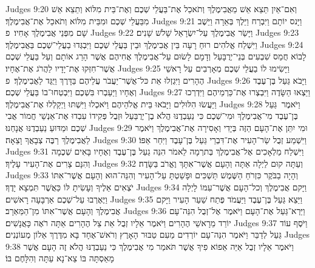 Judges 9:20	וְאִם־אַיִן תֵּצֵא אֵשׁ מֵאֲבִימֶלֶךְ וְתֹאכַל אֶת־בַּעֲלֵי שְׁכֶם וְאֶת־בֵּית מִלּוֹא וְתֵצֵא אֵשׁ מִבַּעֲלֵי שְׁכֶם וּמִבֵּית מִלּוֹא וְתֹאכַל אֶת־אֲבִימֶלֶךְ׃
Judges 9:21	וַיָּנס יוֹתָם וַיִּבְרַח וַיֵּלֶךְ בְּאֵרָה וַיֵּשֶׁב שָׁם מִפְּנֵי אֲבִימֶלֶךְ אָחִיו׃ {פ}
Judges 9:22	וַיָּשַׂר אֲבִימֶלֶךְ עַל־יִשְׂרָאֵל שָׁלֹשׁ שָׁנִים׃
Judges 9:23	וַיִּשְׁלַח אֱלֹהִים רוּחַ רָעָה בֵּין אֲבִימֶלֶךְ וּבֵין בַּעֲלֵי שְׁכֶם וַיִּבְגְּדוּ בַעֲלֵי־שְׁכֶם בַּאֲבִימֶלֶךְ׃
Judges 9:24	לָבוֹא חֲמַס שִׁבְעִים בְּנֵי־יְרֻבָּעַל וְדָמָם לָשׂוּם עַל־אֲבִימֶלֶךְ אֲחִיהֶם אֲשֶׁר הָרַג אוֹתָם וְעַל בַּעֲלֵי שְׁכֶם אֲשֶׁר־חִזְּקוּ אֶת־יָדָיו לַהֲרֹג אֶת־אֶחָיו׃
Judges 9:25	וַיָּשִׂימוּ לוֹ בַעֲלֵי שְׁכֶם מְאָרְבִים עַל רָאשֵׁי הֶהָרִים וַיִּגְזְלוּ אֵת כּל־אֲשֶׁר־יַעֲבֹר עֲלֵיהֶם בַּדָּרֶךְ וַיֻּגַּד לַאֲבִימֶלֶךְ׃ {פ}
Judges 9:26	וַיָּבֹא גַּעַל בֶּן־עֶבֶד וְאֶחָיו וַיַּעַבְרוּ בִּשְׁכֶם וַיִּבְטְחוּ־בוֹ בַּעֲלֵי שְׁכֶם׃
Judges 9:27	וַיֵּצְאוּ הַשָּׂדֶה וַיִּבְצְרוּ אֶת־כַּרְמֵיהֶם וַיִּדְרְכוּ וַיַּעֲשׂוּ הִלּוּלִים וַיָּבֹאוּ בֵּית אֱלֹהֵיהֶם וַיֹּאכְלוּ וַיִּשְׁתּוּ וַיְקַלְלוּ אֶת־אֲבִימֶלֶךְ׃
Judges 9:28	וַיֹּאמֶר  גַּעַל בֶּן־עֶבֶד מִי־אֲבִימֶלֶךְ וּמִי־שְׁכֶם כִּי נַעַבְדֶנּוּ הֲלֹא בֶן־יְרֻבַּעַל וּזְבֻל פְּקִידוֹ עִבְדוּ אֶת־אַנְשֵׁי חֲמוֹר אֲבִי שְׁכֶם וּמַדּוּעַ נַעַבְדֶנּוּ אֲנָחְנוּ׃
Judges 9:29	וּמִי יִתֵּן אֶת־הָעָם הַזֶּה בְּיָדִי וְאָסִירָה אֶת־אֲבִימֶלֶךְ וַיֹּאמֶר לַאֲבִימֶלֶךְ רַבֶּה צְבָאֲךָ וָצֵאָה׃
Judges 9:30	וַיִּשְׁמַע זְבֻל שַׂר־הָעִיר אֶת־דִּבְרֵי גַּעַל בֶּן־עָבֶד וַיִּחַר אַפּוֹ׃
Judges 9:31	וַיִּשְׁלַח מַלְאָכִים אֶל־אֲבִימֶלֶךְ בְּתרְמָה לֵאמֹר הִנֵּה גַעַל בֶּן־עֶבֶד וְאֶחָיו בָּאִים שְׁכֶמָה וְהִנָּם צָרִים אֶת־הָעִיר עָלֶיךָ׃
Judges 9:32	וְעַתָּה קוּם לַיְלָה אַתָּה וְהָעָם אֲשֶׁר־אִתָּךְ וֶאֱרֹב בַּשָּׂדֶה׃
Judges 9:33	וְהָיָה בַבֹּקֶר כִּזְרֹחַ הַשֶּׁמֶשׁ תַּשְׁכִּים וּפָשַׁטְתָּ עַל־הָעִיר וְהִנֵּה־הוּא וְהָעָם אֲשֶׁר־אִתּוֹ יֹצְאִים אֵלֶיךָ וְעָשִׂיתָ לּוֹ כַּאֲשֶׁר תִּמְצָא יָדֶךָ׃
Judges 9:34	וַיָּקם אֲבִימֶלֶךְ וְכל־הָעָם אֲשֶׁר־עִמּוֹ לָיְלָה וַיֶּאֶרְבוּ עַל־שְׁכֶם אַרְבָּעָה רָאשִׁים׃
Judges 9:35	וַיֵּצֵא גַּעַל בֶּן־עֶבֶד וַיַּעֲמֹד פֶּתַח שַׁעַר הָעִיר וַיָּקם אֲבִימֶלֶךְ וְהָעָם אֲשֶׁר־אִתּוֹ מִן־הַמַּאְרָב׃
Judges 9:36	וַיַּרְא־גַּעַל אֶת־הָעָם וַיֹּאמֶר אֶל־זְבֻל הִנֵּה־עָם יוֹרֵד מֵרָאשֵׁי הֶהָרִים וַיֹּאמֶר אֵלָיו זְבֻל אֵת צֵל הֶהָרִים אַתָּה רֹאֶה כָּאֲנָשִׁים׃
Judges 9:37	וַיֹּסֶף עוֹד גַּעַל לְדַבֵּר וַיֹּאמֶר הִנֵּה־עָם יוֹרְדִים מֵעִם טַבּוּר הָאָרֶץ וְרֹאשׁ־אֶחָד בָּא מִדֶּרֶךְ אֵלוֹן מְעוֹנְנִים׃
Judges 9:38	וַיֹּאמֶר אֵלָיו זְבֻל אַיֵּה אֵפוֹא פִיךָ אֲשֶׁר תֹּאמַר מִי אֲבִימֶלֶךְ כִּי נַעַבְדֶנּוּ הֲלֹא זֶה הָעָם אֲשֶׁר מָאַסְתָּה בּוֹ צֵא־נָא עַתָּה וְהִלָּחֶם בּוֹ׃
